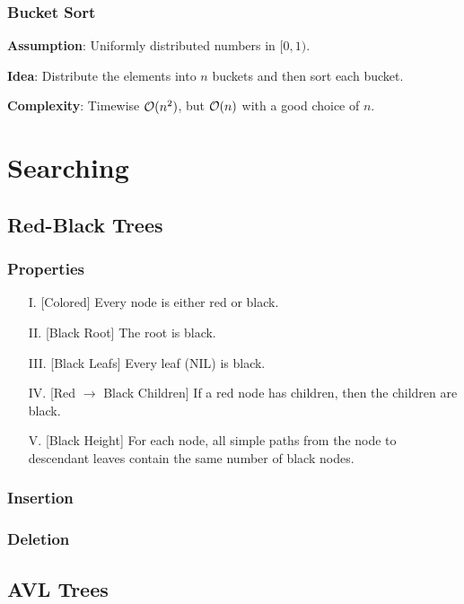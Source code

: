 \documentclass{article}
\begin{document}
\subsubsection{Bucket Sort}
\textbf{Assumption}: Uniformly distributed numbers in $[0,1)$.\par
\textbf{Idea}: Distribute the elements into $n$ buckets and then sort each bucket.\par
\textbf{Complexity}: Timewise $\mathcal{O}(n^2)$, but $\mathcal{O}(n)$ with a good choice of $n$.\par




\section{Searching}
\subsection{Red-Black Trees}
\subsubsection{Properties}
\begin{itemize}
  \item[I.]\label{properties:1} [Colored] Every node is either red or black.
  \item[II.]\label{properties:2} [Black Root] The root is black.
  \item[III.]\label{properties:3} [Black Leafs] Every leaf (NIL) is black.
  \item[IV.]\label{properties:4} [Red $\to$ Black Children] If a red node has children, then the children are black.
  \item[V.]\label{properties:5} [Black Height] For each node, all simple paths from the node to descendant leaves contain the same number of black nodes.
\end{itemize}

\subsubsection{Insertion}


\subsubsection{Deletion}


\subsection{AVL Trees}
\end{document}
